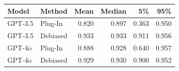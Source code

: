 
\begin{tabular}{llrrrr}
\toprule
Model & Method & Mean & Median & 5\% & 95\%\\
\midrule
GPT-3.5 & Plug-In & 0.820 & 0.897 & 0.363 & 0.950\\
GPT-3.5 & Debiased & 0.933 & 0.933 & 0.911 & 0.956\\
\midrule
GPT-4o & Plug-In & 0.888 & 0.928 & 0.640 & 0.957\\
GPT-4o & Debiased & 0.929 & 0.930 & 0.900 & 0.952\\
\bottomrule
\end{tabular}
